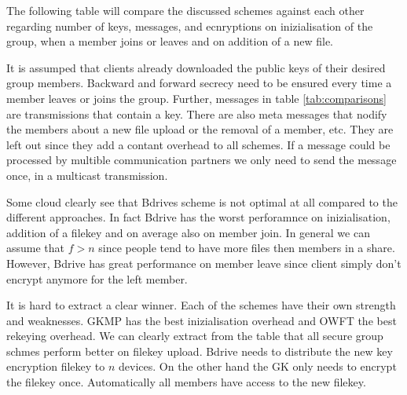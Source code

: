 The following table will compare the discussed schemes against each other regarding number of keys, messages, and ecnryptions on inizialisation of the group, when a member joins or leaves and on addition of a new file. 

It is assumped that clients already downloaded the public keys of their desired group members. Backward and forward secrecy need to be ensured every time a member leaves or joins the group.
Further, messages in table \ref{tab:comparisons} are transmissions that contain a key. There are also meta messages that nodify the members about a new file upload or the removal of a member, etc. They are left out since they add a contant overhead to all schemes.  If a message could be processed by multible communication partners we only need to send the message once, in a multicast transmission.

Some cloud clearly see that Bdrives scheme is not optimal at all compared to the different approaches. In fact Bdrive has the worst perforamnce on inizialisation, addition of a filekey and on average also on member join. In general we can assume that $f > n$ since people tend to have more files then members in a share. However, Bdrive has great performance on member leave since client simply don't encrypt anymore for the left member.

It is hard to extract a clear winner. Each of the schemes have their own strength and weaknesses. GKMP has the best inizialisation overhead and OWFT the best rekeying overhead. We can clearly extract from the table that all secure group schmes perform better on filekey upload. Bdrive needs to distribute the new key encryption filekey to $n$ devices. On the other hand the GK only needs to encrypt the filekey once. Automatically all members have access to the new filekey. 


